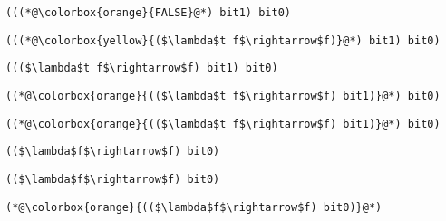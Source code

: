 \documentclass{beamer}
\begin{document}
\begin{frame}[fragile]{\CurrentSection}
\lstset{basicstyle=\ttfamily\small}\lstset{numbers=none}\lstset{language=ML}\begin{lstlisting}
(((*@\colorbox{orange}{FALSE}@*) bit1) bit0)
\end{lstlisting}
\pause\lstset{language=ML}\begin{lstlisting}
(((*@\colorbox{yellow}{($\lambda$t f$\rightarrow$f)}@*) bit1) bit0)
\end{lstlisting}

\end{frame}

\begin{frame}[fragile]{\CurrentSection}
\lstset{basicstyle=\ttfamily\small}\lstset{numbers=none}\lstset{language=ML}\begin{lstlisting}
((($\lambda$t f$\rightarrow$f) bit1) bit0)
\end{lstlisting}
\pause\lstset{language=ML}\begin{lstlisting}
((*@\colorbox{orange}{(($\lambda$t f$\rightarrow$f) bit1)}@*) bit0)
\end{lstlisting}

\end{frame}

\begin{frame}[fragile]{\CurrentSection}
\lstset{basicstyle=\ttfamily\small}\lstset{numbers=none}\lstset{language=ML}\begin{lstlisting}
((*@\colorbox{orange}{(($\lambda$t f$\rightarrow$f) bit1)}@*) bit0)
\end{lstlisting}
\pause\lstset{language=ML}\begin{lstlisting}
(($\lambda$f$\rightarrow$f) bit0)
\end{lstlisting}

\end{frame}

\begin{frame}[fragile]{\CurrentSection}
\lstset{basicstyle=\ttfamily\small}\lstset{numbers=none}\lstset{language=ML}\begin{lstlisting}
(($\lambda$f$\rightarrow$f) bit0)
\end{lstlisting}
\pause\lstset{language=ML}\begin{lstlisting}
(*@\colorbox{orange}{(($\lambda$f$\rightarrow$f) bit0)}@*)
\end{lstlisting}

\end{frame}
\end{document}
